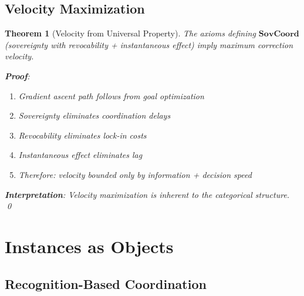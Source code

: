 \documentclass[11pt,a4paper]{article}
\newtheorem{theorem}{Theorem}[section]
\theoremstyle{definition}
\theoremstyle{remark}
\newcommand{\SovCoord}{\mathbf{SovCoord}}
\begin{document}
\subsection{Velocity Maximization}

\begin{theorem}[Velocity from Universal Property]
The axioms defining $\SovCoord$ (sovereignty with revocability + instantaneous effect) imply maximum correction velocity.

\textbf{Proof}: 
\begin{enumerate}
\item Gradient ascent path follows from goal optimization
\item Sovereignty eliminates coordination delays
\item Revocability eliminates lock-in costs
\item Instantaneous effect eliminates lag
\item Therefore: velocity bounded only by information + decision speed
\end{enumerate}

\textbf{Interpretation}: Velocity maximization is inherent to the categorical structure. \qed
\end{theorem}

\section{Instances as Objects}

\subsection{Recognition-Based Coordination}
\end{document}
